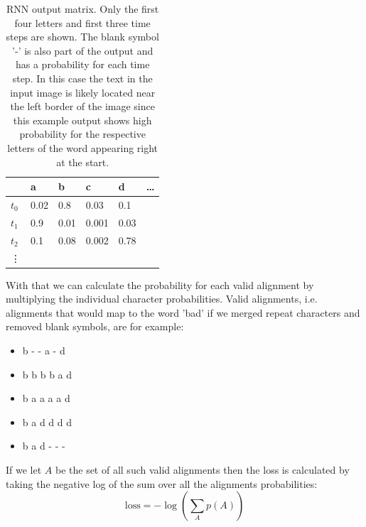 \documentclass{article}
\begin{document}
\begin{table}[H]
\centering
\begin{tabular}{l|l|l|l|l|l}
\label{tab:SampleRNNOutput}
       & a & b & c & d &\ldots \\ \hline
\(t_0\) & 0.02 & 0.8 & 0.03 & 0.1 & \\ \hline
\(t_1\) & 0.9 & 0.01 & 0.001 & 0.03 & \\ \hline
\(t_2\) & 0.1 & 0.08 & 0.002 & 0.78 & \\ \hline
\vdots       &         &         &         & 
\end{tabular}
\caption{RNN output matrix. Only the first four letters and first three time steps are shown. The blank  symbol '-' is also part of the output and has a probability for each time step. In this case the text in the input image is likely located near the left border of the image since this example output shows high probability for the respective letters of the word appearing right at the start.}
\end{table}
With that we can calculate the probability for each valid alignment by multiplying the individual character probabilities. Valid alignments, i.e. alignments that would map to the word 'bad' if we merged repeat characters and removed blank symbols, are for example:
\begin{itemize}
\item b - - a - d
\item b b b b a d 
\item b a a a a d 
\item b a d d d d 
\item b a d - - -
\end{itemize}
If we let \(A\) be the set of all such valid alignments then the loss is calculated by taking the negative log of the sum over all the alignments probabilities:\\
\[
\text{loss} = -\log\left(\sum_A p(A)\right)
\]
\end{document}
